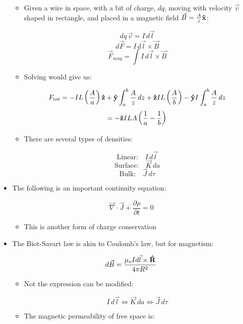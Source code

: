 \begin{itemize}
    \begin{itemize}

      \item Given a wire in space, with a bit of charge, $dq$, moving with velocity $\vec{v}$ shaped in rectangle, and placed in a magnetic field $\vec{B}=\frac{A}{z}\bold{\hat{x}}$:

        $$dq\,\vec{v}=I\,d\vec{l}$$
        $$d\vec{F}=I\,d\vec{l}\times\vec{B}$$
        $$\vec{F}_{mag}=\int I\,d\vec{l}\times\vec{B}$$

      \item Solving would give us:

        $$F_{tot}=-IL\left( \frac{A}{a} \right)\bold{\hat{z}}+\bold{\hat{y}}\int_a^b\frac{A}{z}\,dz+\bold{\hat{z}}IL\left( \frac{A}{b} \right)-\bold{\hat{y}}I\int_a^b\frac{A}{z}\,dz$$
        $$=-\bold{\hat{z}}ILA\left( \frac{1}{a}-\frac{1}{b} \right)$$

      \item There are several types of densities:

        $$\text{Linear:}\quad I\,d\vec{l}$$
        $$\text{Surface:}\quad \vec{K}\,da$$
        $$\text{Bulk:}\quad \vec{J}\,d\tau$$

    \end{itemize}

  \item The following is an important continuity equation:

    $$\vec{\nabla}\cdot\vec{J}+\frac{\partial\rho}{\partial t}=0$$

    \begin{itemize}

      \item This is another form of charge conservation

    \end{itemize}

  \item The Biot-Savart law is akin to Coulomb's law, but for magnetism:

    $$d\vec{B}=\frac{\mu_oI d\vec{l}\times \bold{\hat{R}}}{4\pi R^2}$$

    \begin{itemize}

      \item Not the expression can be modified:

        $$I\,d\vec{l}\Longleftrightarrow\vec{K}\,da\Longleftrightarrow\vec{J}\,d\tau$$

      \item The magnetic permeability of free space is:


\end{itemize}
\end{itemize}
